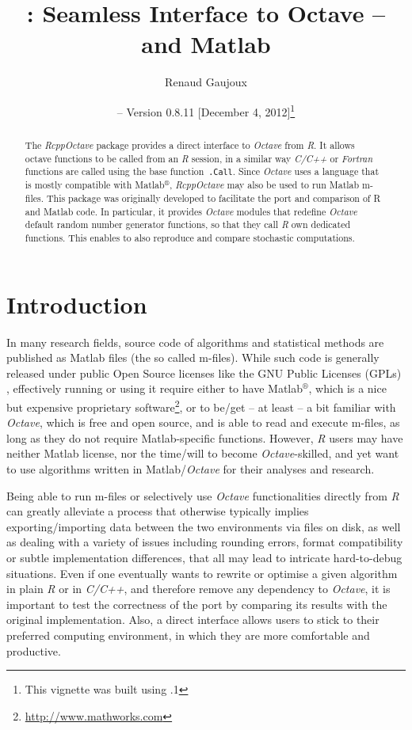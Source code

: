 \documentclass[english,10pt,a4paper]{article}\usepackage{graphicx, color}
\author{Renaud Gaujoux}
\title{\pkgname{RcppOctave}: Seamless Interface to Octave -- and Matlab}
\date{\Rpkg{RcppOctave} -- Version 0.8.11
[December  4, 2012]\footnote{This vignette was built using \octave
3.6.1}}
\newcommand{\matlab}{Matlab$^\circledR$\xspace}
\let\proglang=\textit
\let\code=\texttt
\newcommand{\pkgname}[1]{\textit{#1}\xspace}
\newcommand{\Rpkg}[1]{\pkgname{#1} package\xspace}
\newcommand{\R}{\proglang{R}\xspace}
\newcommand{\octave}{\proglang{Octave}\xspace}
\begin{document}
\maketitle

\begin{abstract}
The \Rpkg{RcppOctave} provides a direct interface to \octave from
\R.
It allows \\octave functions to be called from an \R session,
in a similar way \proglang{C/C++} or \proglang{Fortran} functions are called using the base function~\code{.Call}.
Since \octave uses a language that is mostly compatible with \matlab,
\pkgname{RcppOctave} may also be used to run Matlab m-files.
This package was originally developed to facilitate the port and comparison of R
and Matlab code.
In particular, it provides \octave modules that redefine
\octave default random number generator functions, so that they call
\proglang{R} own dedicated functions.
This enables to also reproduce and compare stochastic computations.
\end{abstract}

\noindent\hrulefill
\tableofcontents
\noindent\hrulefill

\section{Introduction}

In many research fields, source code of algorithms and statistical methods are
published as Matlab files (the so called m-files).
While such code is generally released under public Open Source licenses like the
GNU Public Licenses (GPLs) \cite{gnuGPL}, effectively running or using it
require either to have \matlab, which is a nice but expensive proprietary
software\footnote{\url{http://www.mathworks.com}}, or to be/get -- at least -- a bit familiar with \octave \cite{Eaton2002}, which is free and open source, and is able to read and execute m-files, as long as they do not require Matlab-specific functions.
However, \proglang{R} users may have neither Matlab license, nor the
time/will to become \octave-skilled, and yet want to use algorithms written in
Matlab/\octave for their analyses and research.

Being able to run m-files or selectively use \octave functionalities
directly from \proglang{R} can greatly alleviate a process that otherwise
typically implies exporting/importing data between the two environments via
files on disk, as well as dealing with a variety of issues including
rounding errors, format compatibility or subtle implementation differences,
that all may lead to intricate hard-to-debug situations.
Even if one eventually wants to rewrite or optimise a given algorithm in plain
\proglang{R} or in \proglang{C/C++}, and therefore remove any dependency to
\octave, it is important to test the correctness of the port by
comparing its results with the original implementation.
Also, a direct interface allows users to stick to their preferred computing
environment, in which they are more comfortable and productive.
\end{document}

